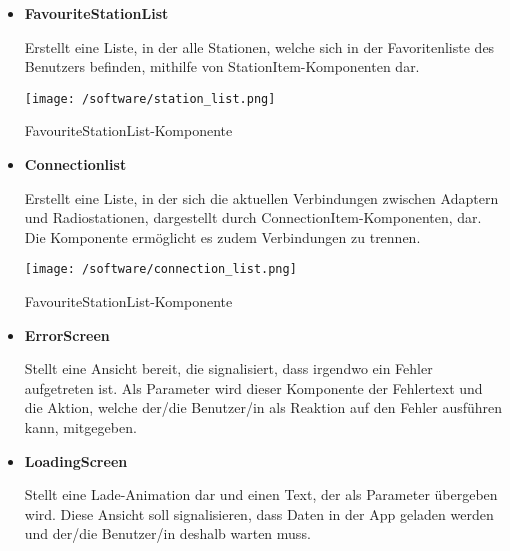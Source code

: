 \documentclass[11pt, twoside]{article}
\begin{document}
\begin{itemize}
	\item \textbf{FavouriteStationList}
	\par Erstellt eine Liste, in der alle Stationen, welche sich in der Favoritenliste des Benutzers befinden, mithilfe von StationItem-Komponenten dar.
	\begin{flushleft}
    		\captionsetup{type=figure}
     	\texttt{[image: /software/station\_list.png]}
    		\caption{FavouriteStationList-Komponente}
    	\end{flushleft}
	\item \textbf{Connectionlist}
	\par Erstellt eine Liste, in der sich die aktuellen Verbindungen zwischen Adaptern und Radiostationen, dargestellt durch ConnectionItem-Komponenten, dar. Die Komponente ermöglicht es zudem Verbindungen zu trennen.
	\begin{flushleft}
    		\captionsetup{type=figure}
     	\texttt{[image: /software/connection\_list.png]}
    		\caption{FavouriteStationList-Komponente}
    	\end{flushleft}
	\item \textbf{ErrorScreen}
	\par Stellt eine Ansicht bereit, die signalisiert, dass irgendwo ein Fehler aufgetreten ist. Als Parameter wird dieser Komponente der Fehlertext und die Aktion, welche der/die Benutzer/in als Reaktion auf den Fehler ausführen kann, mitgegeben.
	\item \textbf{LoadingScreen}
	\par Stellt eine Lade-Animation dar und einen Text, der als Parameter übergeben wird. Diese Ansicht soll signalisieren, dass Daten in der App geladen werden und der/die Benutzer/in deshalb warten muss.
\end{itemize}
\end{document}
